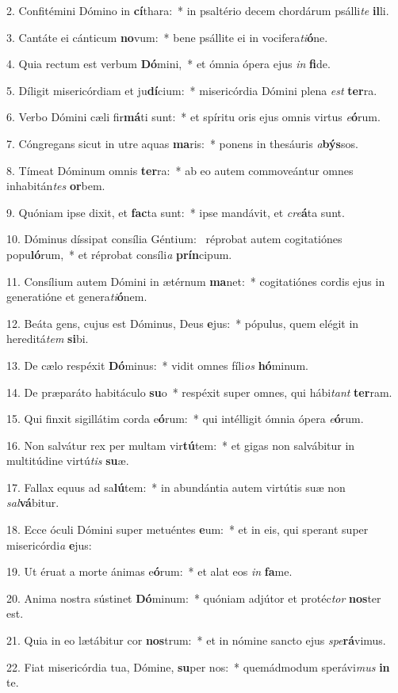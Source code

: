 2. Confitémini Dómino in \textbf{cí}thara:~*  in psaltério decem chordárum psálli\textit{te} \textbf{il}li.\

3. Cantáte ei cánticum \textbf{no}vum:~*  bene psállite ei in vocifera\textit{ti}\textbf{ó}ne.\

4. Quia rectum est verbum \textbf{Dó}mini,~*  et ómnia ópera ejus \textit{in} \textbf{fi}de.\

5. Díligit misericórdiam et ju\textbf{dí}cium:~*  misericórdia Dómini plena \textit{est} \textbf{ter}ra.\

6. Verbo Dómini cæli fir\textbf{má}ti sunt:~*  et spíritu oris ejus omnis virtus \textit{e}\textbf{ó}rum.\

7. Cóngregans sicut in utre aquas \textbf{ma}ris:~*  ponens in thesáuris \textit{a}\textbf{býs}sos.\

8. Tímeat Dóminum omnis \textbf{ter}ra:~*  ab eo autem commoveántur omnes inhabitán\textit{tes} \textbf{or}bem.\

9. Quóniam ipse dixit, et \textbf{fac}ta sunt:~*  ipse mandávit, et \textit{cre}\textbf{á}ta sunt.\

10. Dóminus díssipat consília Géntium: \dag\  réprobat autem cogitatiónes popu\textbf{ló}rum,~*  et réprobat consíli\textit{a} \textbf{prín}cipum.\

11. Consílium autem Dómini in ætérnum \textbf{ma}net:~*  cogitatiónes cordis ejus in generatióne et genera\textit{ti}\textbf{ó}nem.\

12. Beáta gens, cujus est Dóminus, Deus \textbf{e}jus:~*  pópulus, quem elégit in hereditá\textit{tem} \textbf{si}bi.\

13. De cælo respéxit \textbf{Dó}minus:~*  vidit omnes fíli\textit{os} \textbf{hó}minum.\

14. De præparáto habitáculo \textbf{su}o~*  respéxit super omnes, qui hábi\textit{tant} \textbf{ter}ram.\

15. Qui finxit sigillátim corda e\textbf{ó}rum:~*  qui intélligit ómnia ópera \textit{e}\textbf{ó}rum.\

16. Non salvátur rex per multam vir\textbf{tú}tem:~*  et gigas non salvábitur in multitúdine virtú\textit{tis} \textbf{su}æ.\

17. Fallax equus ad sa\textbf{lú}tem:~*  in abundántia autem virtútis suæ non \textit{sal}\textbf{vá}bitur.\

18. Ecce óculi Dómini super metuéntes \textbf{e}um:~*  et in eis, qui sperant super misericórdi\textit{a} \textbf{e}jus:\

19. Ut éruat a morte ánimas e\textbf{ó}rum:~*  et alat eos \textit{in} \textbf{fa}me.\

20. Anima nostra sústinet \textbf{Dó}minum:~*  quóniam adjútor et protéc\textit{tor} \textbf{nos}ter est.\

21. Quia in eo lætábitur cor \textbf{nos}trum:~*  et in nómine sancto ejus \textit{spe}\textbf{rá}vimus.\

22. Fiat misericórdia tua, Dómine, \textbf{su}per nos:~*  quemádmodum sperávi\textit{mus} \textbf{in} te.\

